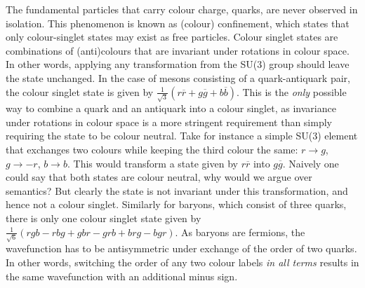     The fundamental particles that carry colour charge, quarks, are never observed in isolation. This phenomenon is known as (colour) confinement, which states that only colour-singlet states may exist as free particles. Colour singlet states are combinations of (anti)colours that are invariant under rotations in colour space. In other words, applying any transformation from the SU(3) group should leave the state unchanged. 
    In the case of mesons consisting of a quark-antiquark pair, the colour singlet state is given by $\frac{1}{\sqrt{3}}(r\overline{r} + g\overline{g} + b\overline{b})$. This is the \textit{only} possible way to combine a quark and an antiquark into a colour singlet, as invariance under rotations in colour space is a more stringent requirement than simply requiring the state to be colour neutral. Take for instance a simple SU(3) element that exchanges two colours while keeping the third colour the same: $r\rightarrow g$, $g \rightarrow -r$, $b\rightarrow b$.  This would transform a state given by $r\overline{r}$ into $g\overline{g}$. Naively one could say that both states are colour neutral, why would we argue over semantics?  But clearly the state is not invariant under this transformation, and hence not a colour singlet. Similarly for baryons, which consist of three quarks, there is only one colour singlet state given by $\frac{1}{\sqrt{6}}(rgb - rbg + gbr - grb + brg - bgr)$. As baryons are fermions, the wavefunction has to be antisymmetric under exchange of the order of two quarks.  In other words, switching the order of any two colour labels \textit{in all terms} results in the same wavefunction with an additional minus sign. 

